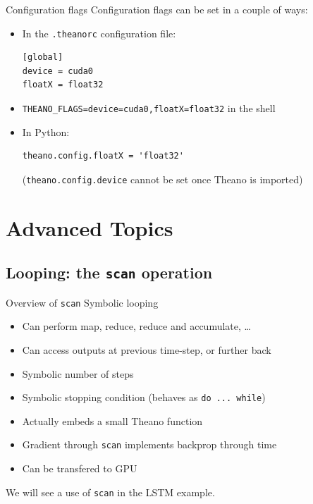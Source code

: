 \documentclass[a4paper,9pt]{beamer}
\begin{document}
\begin{frame}[fragile]{Configuration flags}
  Configuration flags can be set in a couple of ways:
  \begin{itemize}
    \item In the \verb|.theanorc| configuration file:
      \begin{verbatim}
[global]
device = cuda0
floatX = float32
      \end{verbatim}
    \item \verb|THEANO_FLAGS=device=cuda0,floatX=float32| in the shell
    \item In Python:
      \begin{verbatim}
theano.config.floatX = 'float32'
      \end{verbatim}
      (\verb|theano.config.device| cannot be set once Theano is imported)
  \end{itemize}
\end{frame}


\section{Advanced Topics}
\begin{frame}
  \tableofcontents[currentsection]
\end{frame}

\subsection{Looping: the \texttt{scan} operation}
\begin{frame}[fragile]{Overview of \texttt{scan}}
  Symbolic looping
  \begin{itemize}
    \item Can perform map, reduce, reduce and accumulate, \ldots
    \item Can access outputs at previous time-step, or further back
    \item Symbolic number of steps
    \item Symbolic stopping condition (behaves as \verb|do ... while|)
    \item Actually embeds a small Theano function
    \item Gradient through \verb|scan| implements backprop through time
    \item Can be transfered to GPU
  \end{itemize}
  We will see a use of \verb|scan| in the LSTM example.
\end{frame}
\end{document}
